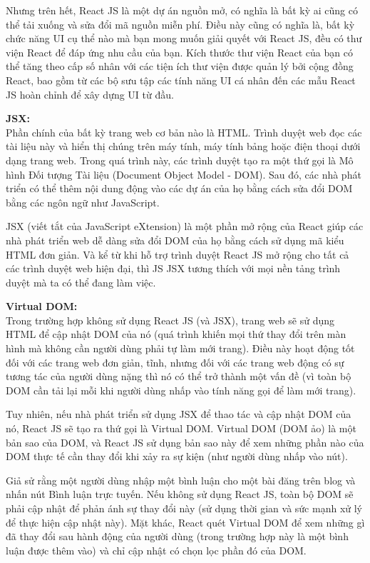 Nhưng trên hết, React JS là một dự án nguồn mở, có nghĩa là bất kỳ ai cũng có thể tải xuống và sửa đổi mã nguồn miễn phí. Điều này cũng có nghĩa là, bất kỳ chức năng UI cụ thể nào mà bạn mong muốn giải quyết với React JS, đều có thư viện React để đáp ứng nhu cầu của bạn. Kích thước thư viện React của bạn có thể tăng theo cấp số nhân với các tiện ích thư viện được quản lý bởi cộng đồng React, bao gồm từ các bộ sưu tập các tính năng UI cá nhân đến các mẫu React JS hoàn chỉnh để xây dựng UI từ đầu.

\textbf{JSX:}\\
Phần chính của bất kỳ trang web cơ bản nào là HTML. Trình duyệt web đọc các tài liệu này và hiển thị chúng trên máy tính, máy tính bảng hoặc điện thoại dưới dạng trang web. Trong quá trình này, các trình duyệt tạo ra một thứ gọi là Mô hình Đối tượng Tài liệu (Document Object Model - DOM). Sau đó, các nhà phát triển có thể thêm nội dung động vào các dự án của họ bằng cách sửa đổi DOM bằng các ngôn ngữ như JavaScript.

JSX (viết tắt của JavaScript eXtension) là một phần mở rộng của React giúp các nhà phát triển web dễ dàng sửa đổi DOM của họ bằng cách sử dụng mã kiểu HTML đơn giản. Và kể từ khi hỗ trợ trình duyệt React JS mở rộng cho tất cả các trình duyệt web hiện đại, thì JS JSX tương thích với mọi nền tảng trình duyệt mà ta có thể đang làm việc.

\textbf{Virtual DOM:}\\
Trong trường hợp không sử dụng React JS (và JSX), trang web sẽ sử dụng HTML để cập nhật DOM của nó (quá trình khiến mọi thứ thay đổi trên màn hình mà không cần người dùng phải tự làm mới trang). Điều này hoạt động tốt đối với các trang web đơn giản, tĩnh, nhưng đối với các trang web động có sự tương tác của người dùng nặng thì nó có thể trở thành một vấn đề (vì toàn bộ DOM cần tải lại mỗi khi người dùng nhấp vào tính năng gọi để làm mới trang).

Tuy nhiên, nếu nhà phát triển sử dụng JSX để thao tác và cập nhật DOM của nó, React JS sẽ tạo ra thứ gọi là Virtual DOM. Virtual DOM (DOM ảo) là một bản sao của DOM, và React JS sử dụng bản sao này để xem những phần nào của DOM thực tế cần thay đổi khi xảy ra sự kiện (như người dùng nhấp vào nút).

Giả sử rằng một người dùng nhập một bình luận cho một bài đăng trên blog và nhấn nút Bình luận trực tuyến. Nếu không sử dụng React JS, toàn bộ DOM sẽ phải cập nhật để phản ánh sự thay đổi này (sử dụng thời gian và sức mạnh xử lý để thực hiện cập nhật này). Mặt khác, React quét Virtual DOM để xem những gì đã thay đổi sau hành động của người dùng (trong trường hợp này là một bình luận được thêm vào) và chỉ cập nhật có chọn lọc phần đó của DOM.

